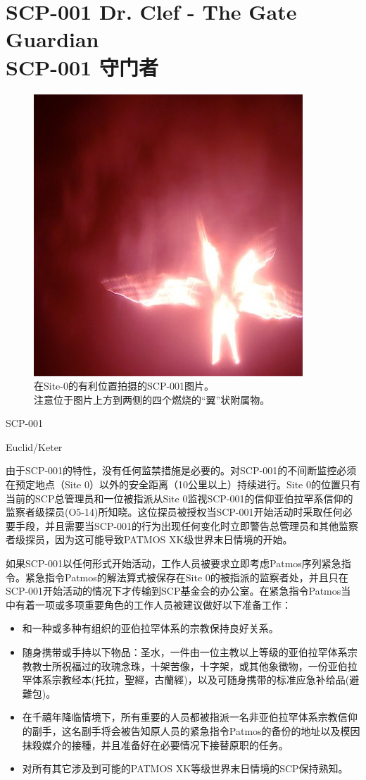 \chapter[SCP-001 守门者]{
	SCP-001 Dr. Clef - The Gate Guardian \\
	SCP-001 守门者
}

\label{chap:SCP-001.the.gate.guardian}

\begin{figure}[H]
	\centering
	\includegraphics[width=0.5\linewidth]{images/SCP.001.the.gate.guardian.jpg}
	\caption*{
		在Site-0的有利位置拍摄的SCP-001图片。 \\
		注意位于图片上方到两侧的四个燃烧的“翼”状附属物。
	}
\end{figure}

SCP-001

Euclid/Keter

由于SCP-001的特性，没有任何监禁措施是必要的。对SCP-001的不间断监控必须在预定地点（Site 0）以外的安全距离（10公里以上）持续进行。Site 0的位置只有当前的SCP总管理员和一位被指派从Site 0监视SCP-001的信仰亚伯拉罕系信仰的监察者级探员(O5-14)所知晓。这位探员被授权当SCP-001开始活动时采取任何必要手段，并且需要当SCP-001的行为出现任何变化时立即警告总管理员和其他监察者级探员，因为这可能导致PATMOS XK级世界末日情境的开始。

如果SCP-001以任何形式开始活动，工作人员被要求立即考虑Patmos序列紧急指令。紧急指令Patmos的解法算式被保存在Site 0的被指派的监察者处，并且只在SCP-001开始活动的情况下才传输到SCP基金会的办公室。在紧急指令Patmos当中有着一项或多项重要角色的工作人员被建议做好以下准备工作：

\begin{itemize}
	\item 和一种或多种有组织的亚伯拉罕体系的宗教保持良好关系。
	\item 随身携带或手持以下物品：圣水，一件由一位主教以上等级的亚伯拉罕体系宗教教士所祝福过的玫瑰念珠，十架苦像，十字架，或其他象徵物，一份亚伯拉罕体系宗教经本(托拉，聖經，古蘭經)，以及可随身携带的标准应急补给品(避難包)。
	\item 在千禧年降临情境下，所有重要的人员都被指派一名非亚伯拉罕体系宗教信仰的副手，这名副手将会被告知原人员的紧急指令Patmos的备份的地址以及模因抹殺媒介的接種，并且准备好在必要情况下接替原职的任务。
	\item 对所有其它涉及到可能的PATMOS XK等级世界末日情境的SCP保持熟知。
\end{itemize}

